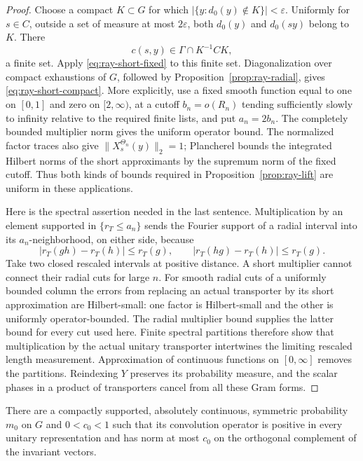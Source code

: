 \begin{proof}
Choose a compact \(K\subset G\) for which
\(|\{y:d_0(y)\notin K\}|<\varepsilon\).
Uniformly for \(s\in C\), outside a set of measure at most
\(2\varepsilon\), both \(d_0(y)\) and \(d_0(sy)\) belong to \(K\).
There
\[
 c(s,y)\in \Gamma\cap K^{-1}CK,
\]
a finite set.  Apply \eqref{eq:ray-short-fixed} to this finite
set.  Diagonalization over compact exhaustions of \(G\), followed
by Proposition~\ref{prop:ray-radial}, gives
\eqref{eq:ray-short-compact}.  More explicitly, use a fixed
smooth function equal to one on \([0,1]\) and zero on \([2,\infty)\),
at a cutoff \(b_n=o(R_n)\) tending sufficiently slowly to infinity
relative to the required finite lists, and put \(a_n=2b_n\).
The completely bounded multiplier norm gives the uniform
operator bound.  The normalized factor traces also give
\(\|X_s^{\Theta_n}(y)\|_2=1\); Plancherel bounds the integrated
Hilbert norms of the short approximants by the supremum norm of
the fixed cutoff.  Thus both kinds of bounds required in
Proposition~\ref{prop:ray-lift} are uniform in these applications.

Here is the spectral assertion needed in the last sentence.
Multiplication by an element supported in \(\{r_T\le a_n\}\) sends
the Fourier support of a radial interval into its
\(a_n\)-neighborhood, on either side, because
\begin{equation}
 |r_T(gh)-r_T(h)|\le r_T(g),\qquad
 |r_T(hg)-r_T(h)|\le r_T(g).
 \label{eq:ray-triangle}
\end{equation}
Take two closed rescaled intervals at positive distance.  A short
multiplier cannot connect their radial cuts for large \(n\).
For smooth radial cuts of a uniformly bounded column the errors
from replacing an actual transporter by its short approximation
are Hilbert-small: one factor is Hilbert-small and the other is
uniformly operator-bounded.  The radial multiplier bound supplies
the latter bound for every cut used here.  Finite spectral
partitions therefore show that multiplication by the actual
unitary transporter intertwines the limiting rescaled length
measurement.  Approximation of continuous functions on
\([0,\infty]\) removes the partitions.  Reindexing \(Y\) preserves
its probability measure, and the scalar phases in a product of
transporters cancel from all these Gram forms.
\end{proof}

\begin{lemma}\label{lem:ray-kazhdan}
There are a compactly supported, absolutely continuous, symmetric
probability \(m_0\) on \(G\) and \(0<c_0<1\) such that its
convolution operator is positive in every unitary representation
and has norm at most \(c_0\) on the orthogonal complement of the
invariant vectors.
\end{lemma}

